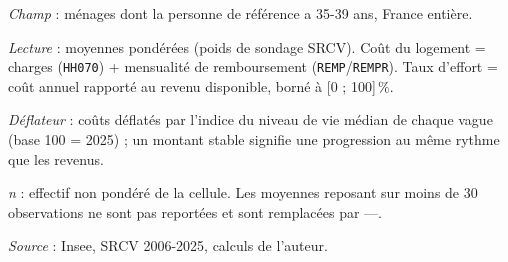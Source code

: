 \documentclass[12pt,a4paper]{article}
\begin{document}
\begin{table}[htbp]
\begin{threeparttable}
\begin{tabular}{lrrrrrrrrrr}
			\bottomrule
		\end{tabular}
		\begin{tablenotes}[flushleft]\scriptsize
			\item \textit{Champ} : ménages dont la personne de référence a 35-39 ans, France entière.
			\item \textit{Lecture} : moyennes pondérées (poids de sondage SRCV). Coût du logement =
			charges (\texttt{HH070}) + mensualité de remboursement (\texttt{REMP}/\texttt{REMPR}).
			Taux d'effort = coût annuel rapporté au revenu disponible, borné à [0 ; 100]\,\%.
			\item \textit{Déflateur} : coûts déflatés par l'indice du niveau de vie médian de chaque vague (base 100 = 2025) ; un montant stable signifie une progression au même rythme que les revenus.
			\item \textit{n} : effectif non pondéré de la cellule. Les moyennes reposant sur
			moins de 30 observations ne sont pas reportées et sont remplacées par ---.
			\item \textit{Source} : Insee, SRCV 2006-2025, calculs de l'auteur.
		\end{tablenotes}
	\end{threeparttable}
\end{table}
	
	
\end{document}
